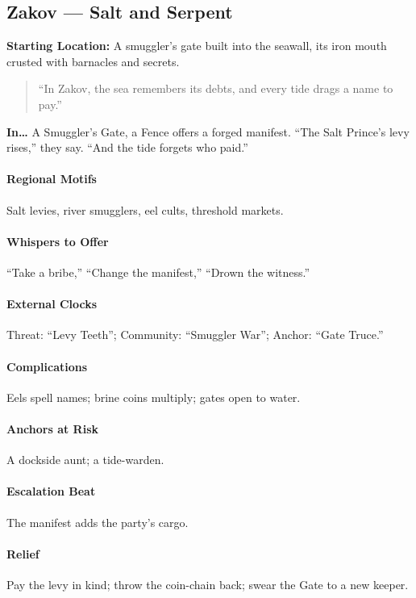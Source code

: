 \subsection*{Zakov — Salt and Serpent}
\textbf{Starting Location:} A smuggler’s gate built into the seawall, its iron mouth crusted with barnacles and secrets.
\begin{quote}
“In Zakov, the sea remembers its debts, and every tide drags a name to pay.”
\end{quote}

\textbf{In…} A Smuggler’s Gate, a Fence offers a forged manifest. ``The Salt Prince’s levy rises,'' they say. ``And the tide forgets who paid.''
\paragraph{Regional Motifs} Salt levies, river smugglers, eel cults, threshold markets.
\paragraph{Whispers to Offer} ``Take a bribe,'' ``Change the manifest,'' ``Drown the witness.''
\paragraph{External Clocks} Threat: ``Levy Teeth''; Community: ``Smuggler War''; Anchor: ``Gate Truce.''
\paragraph{Complications} Eels spell names; brine coins multiply; gates open to water.
\paragraph{Anchors at Risk} A dockside aunt; a tide-warden.
\paragraph{Escalation Beat} The manifest adds the party’s cargo.
\paragraph{Relief} Pay the levy in kind; throw the coin-chain back; swear the Gate to a new keeper.

